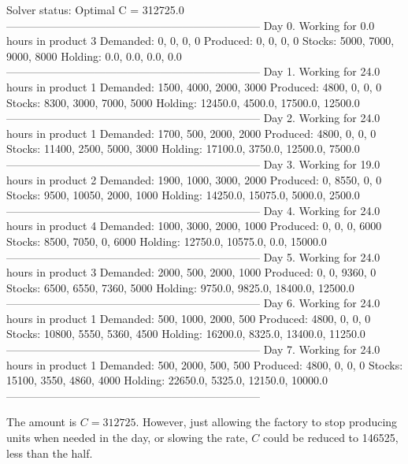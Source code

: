 \documentclass[11pt,a4paper]{article}
\begin{document}
\begin{textcode}
 
Solver status: Optimal
C = 312725.0
---------------------------------------------------------------------
Day 0. Working for 0.0 hours in product 3
Demanded:          0,          0,          0,          0
Produced:          0,          0,          0,          0
Stocks:         5000,       7000,       9000,       8000
Holding:         0.0,        0.0,        0.0,        0.0
---------------------------------------------------------------------
Day 1. Working for 24.0 hours in product 1
Demanded:       1500,       4000,       2000,       3000
Produced:       4800,          0,          0,          0
Stocks:         8300,       3000,       7000,       5000
Holding:     12450.0,     4500.0,    17500.0,    12500.0
---------------------------------------------------------------------
Day 2. Working for 24.0 hours in product 1
Demanded:       1700,        500,       2000,       2000
Produced:       4800,          0,          0,          0
Stocks:        11400,       2500,       5000,       3000
Holding:     17100.0,     3750.0,    12500.0,     7500.0
---------------------------------------------------------------------
Day 3. Working for 19.0 hours in product 2
Demanded:       1900,       1000,       3000,       2000
Produced:          0,       8550,          0,          0
Stocks:         9500,      10050,       2000,       1000
Holding:     14250.0,    15075.0,     5000.0,     2500.0
---------------------------------------------------------------------
Day 4. Working for 24.0 hours in product 4
Demanded:       1000,       3000,       2000,       1000
Produced:          0,          0,          0,       6000
Stocks:         8500,       7050,          0,       6000
Holding:     12750.0,    10575.0,        0.0,    15000.0
---------------------------------------------------------------------
Day 5. Working for 24.0 hours in product 3
Demanded:       2000,        500,       2000,       1000
Produced:          0,          0,       9360,          0
Stocks:         6500,       6550,       7360,       5000
Holding:      9750.0,     9825.0,    18400.0,    12500.0
---------------------------------------------------------------------
Day 6. Working for 24.0 hours in product 1
Demanded:        500,       1000,       2000,        500
Produced:       4800,          0,          0,          0
Stocks:        10800,       5550,       5360,       4500
Holding:     16200.0,     8325.0,    13400.0,    11250.0
---------------------------------------------------------------------
Day 7. Working for 24.0 hours in product 1
Demanded:        500,       2000,        500,        500
Produced:       4800,          0,          0,          0
Stocks:        15100,       3550,       4860,       4000
Holding:     22650.0,     5325.0,    12150.0,    10000.0
---------------------------------------------------------------------
\end{textcode}
%
The amount is $C = 312725$. However, just allowing the factory to stop producing 
units when needed in the day, or slowing the rate, $C$ could be reduced to 
146525, less than the half.
\end{document}
